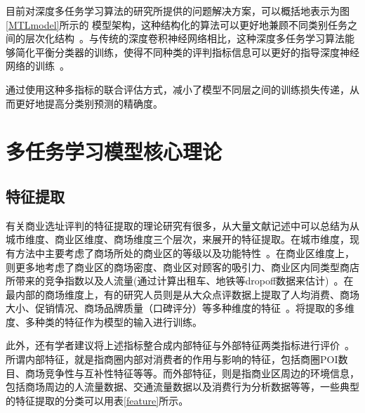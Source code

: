 \documentclass{llncs}
\begin{document}
目前对深度多任务学习算法的研究所提供的问题解决方案，可以概括地表示为图\ref{MTLmodel}所示的 模型架构，这种结构化的算法可以更好地兼顾不同类别任务之间的层次化结构~\cite{ZhaoQiLu}。与传统的深度卷积神经网络相比，这种深度多任务学习算法能够简化平衡分类器的训练，使得不同种类的评判指标信息可以更好的指导深度神经网络的训练~\cite{DataClassify}。

通过使用这种多指标的联合评估方式，减小了模型不同层之间的训练损失传递，从而更好地提高分类别预测的精确度。


\section{多任务学习模型核心理论}
\subsection{特征提取}
有关商业选址评判的特征提取的理论研究有很多，从大量文献记述中可以总结为从城市维度、商业区维度、商场维度三个层次，来展开的特征提取。在城市维度，现有方法中主要考虑了商场所处的商业区的等级以及功能特性~\cite{cityLevel}。在商业区维度上，则更多地考虑了商业区的商场密度、商业区对顾客的吸引力、商业区内同类型商店所带来的竞争指数以及人流量(通过计算出租车、地铁等dropoff数据来估计)~\cite{traffic}。在最内部的商场维度上，有的研究人员则是从大众点评数据上提取了人均消费、商场大小、促销情况、商场品牌质量（口碑评分）等多种维度的特征~\cite{mallLevel}。将提取的多维度、多种类的特征作为模型的输入进行训练。

此外，还有学者建议将上述指标整合成内部特征与外部特征两类指标进行评价~\cite{IEfeatures}。所谓内部特征，就是指商圈内部对消费者的作用与影响的特征，包括商圈POI数目、商场竞争性与互补性特征等等。而外部特征，则是指商业区周边的环境信息，包括商场周边的人流量数据、交通流量数据以及消费行为分析数据等等，一些典型的特征提取的分类可以用表\ref{feature}所示。
\end{document}
